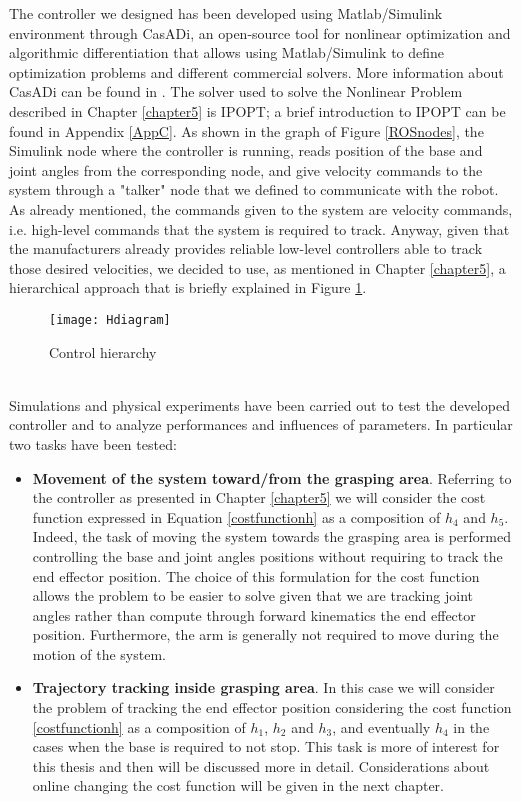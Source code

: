 The controller we designed has been developed using Matlab/Simulink environment through CasADi, an open-source tool for nonlinear optimization and algorithmic differentiation that allows using Matlab/Simulink to define optimization problems and different commercial solvers. More information about CasADi can be found in \cite{Andersson2018}. The solver used to solve the Nonlinear Problem described in Chapter \ref{chapter5} is IPOPT; a brief introduction to IPOPT can be found in Appendix \ref{AppC}. As shown in the graph of Figure \ref{ROSnodes}, the Simulink node where the controller is running, reads position of the base and joint angles from the corresponding node, and give velocity commands to the system through a "talker" node that we defined to communicate with the robot. As already mentioned, the commands given to the system are velocity commands, i.e. high-level commands that the system is required to track. Anyway, given that the manufacturers already provides reliable low-level controllers able to track those desired velocities, we decided to use, as mentioned in Chapter \ref{chapter5}, a hierarchical approach that is briefly explained in Figure \ref{Hdiagram}.  
\begin{figure}[h!]

	\texttt{[image: Hdiagram]}
	\centering
	
	\caption{Control hierarchy} 

\label{Hdiagram}
\end{figure}
\\
Simulations and physical experiments have been carried out to test the developed controller and to analyze performances and influences of parameters. In particular two tasks have been tested: 

\begin{itemize}
\item \textbf{Movement of the system toward/from the grasping area}. Referring to the controller as presented in Chapter \ref{chapter5} we will consider the cost function expressed in Equation \eqref{costfunctionh} as a composition of $h_4$ and $h_5$. Indeed, the task of moving the system towards the grasping area is performed controlling the base and joint angles positions without requiring to track the end effector position. The choice of this formulation for the cost function allows the problem to be easier to solve given that we are tracking joint angles rather than compute through forward kinematics the end effector position. Furthermore, the arm is generally not required to move during the motion of the system.

\item \textbf{Trajectory tracking inside grasping area}. In this case we will consider the problem of tracking the end effector position considering the cost function \eqref{costfunctionh} as a composition of $h_1$, $h_2$ and $h_3$, and eventually $h_4$ in the cases when the base is required to not stop. This task is more of interest for this thesis and then will be discussed more in detail. Considerations about online changing the cost function will be given in the next chapter. 
\end{itemize}
